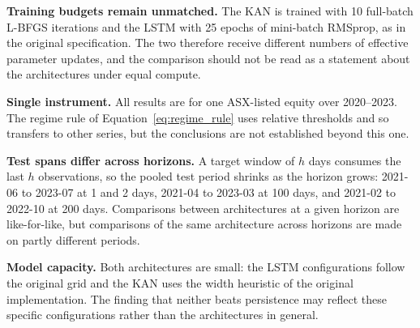 \noindent\textbf{Training budgets remain unmatched.} The KAN is trained with 10
full-batch L-BFGS iterations and the LSTM with 25 epochs of mini-batch RMSprop,
as in the original specification. The two therefore receive different numbers of
effective parameter updates, and the comparison should not be read as a
statement about the architectures under equal compute.

\noindent\textbf{Single instrument.} All results are for one ASX-listed equity
over 2020--2023. The regime rule of Equation~\eqref{eq:regime_rule} uses
relative thresholds and so transfers to other series, but the conclusions are
not established beyond this one.

\noindent\textbf{Test spans differ across horizons.} A target window of $h$ days
consumes the last $h$ observations, so the pooled test period shrinks as the
horizon grows: 2021-06 to 2023-07 at 1 and 2 days, 2021-04 to 2023-03 at 100
days, and 2021-02 to 2022-10 at 200 days. Comparisons between architectures at a
given horizon are like-for-like, but comparisons of the same architecture across
horizons are made on partly different periods.

\noindent\textbf{Model capacity.} Both architectures are small: the LSTM
configurations follow the original grid and the KAN uses the width heuristic of
the original implementation. The finding that neither beats persistence may
reflect these specific configurations rather than the architectures in general.
